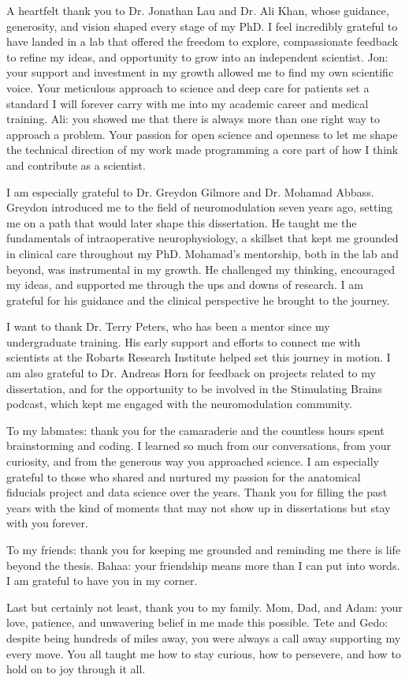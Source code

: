 \onehalfspacing
A heartfelt thank you to Dr. Jonathan Lau and Dr. Ali Khan, whose guidance, generosity, and vision shaped every stage of my PhD. I feel incredibly grateful to have landed in a lab that offered the freedom to explore, compassionate feedback to refine my ideas, and opportunity to grow into an independent scientist. Jon: your support and investment in my growth allowed me to find my own scientific voice. Your meticulous approach to science and deep care for patients set a standard I will forever carry with me into my academic career and medical training. Ali: you showed me that there is always more than one right way to approach a problem. Your passion for open science and openness to let me shape the technical direction of my work made programming a core part of how I think and contribute as a scientist.

I am especially grateful to Dr. Greydon Gilmore and Dr. Mohamad Abbass. Greydon introduced me to the field of neuromodulation seven years ago, setting me on a path that would later shape this dissertation. He taught me the fundamentals of intraoperative neurophysiology, a skillset that kept me grounded in clinical care throughout my PhD. Mohamad's mentorship, both in the lab and beyond, was instrumental in my growth. He challenged my thinking, encouraged my ideas, and supported me through the ups and downs of research. I am grateful for his guidance and the clinical perspective he brought to the journey.

I want to thank Dr. Terry Peters, who has been a mentor since my undergraduate training. His early support and efforts to connect me with scientists at the Robarts Research Institute helped set this journey in motion. I am also grateful to Dr. Andreas Horn for feedback on projects related to my dissertation, and for the opportunity to be involved in the Stimulating Brains podcast, which kept me engaged with the neuromodulation community.

To my labmates: thank you for the camaraderie and the countless hours spent brainstorming and coding. I learned so much from our conversations, from your curiosity, and from the generous way you approached science. I am especially grateful to those who shared and nurtured my passion for the anatomical fiducials project and data science over the years. Thank you for filling the past years with the kind of moments that may not show up in dissertations but stay with you forever.

To my friends: thank you for keeping me grounded and reminding me there is life beyond the thesis. Bahaa: your friendship means more than I can put into words. I am grateful to have you in my corner.

Last but certainly not least, thank you to my family. Mom, Dad, and Adam: your love, patience, and unwavering belief in me made this possible. Tete and Gedo: despite being hundreds of miles away, you were always a call away supporting my every move. You all taught me how to stay curious, how to persevere, and how to hold on to joy through it all.